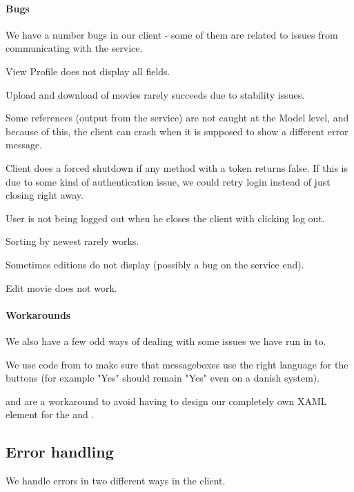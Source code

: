 \paragraph{Bugs} We have a number bugs in our client - some of them are related to issues from communicating with the service.
\begin{my_itemize}
\item View Profile does not display all fields.
\item Upload and download of movies rarely succeeds due to stability issues.
\item Some  references (output from the service) are not caught at the Model level, and because of this, the client can crash when it is supposed to show a different error message.
\item Client does a forced shutdown if any method with a token returns false. If this is due to some kind of authentication issue, we could retry login instead of just closing right away.
\item User is not being logged out when he closes the client with clicking log out.
\item Sorting by newest rarely works.
\item Sometimes editions do not display (possibly a bug on the service end).
\item Edit movie does not work.
\end{my_itemize}

\paragraph{Workarounds} We also have a few odd ways of dealing with some issues we have run in to.
\begin{my_itemize}
\item We use code from \cite{CODE:MSGBOX} to make sure that messageboxes use the right language for the buttons (for example "Yes" should remain "Yes" even on a danish system).
\item {} and  are a workaround to avoid having to design our completely own XAML element for the  and .
\end{my_itemize}

\subsection{Error handling}
\label{Implementation_Client_Error}
We handle errors in two different ways in the client.
